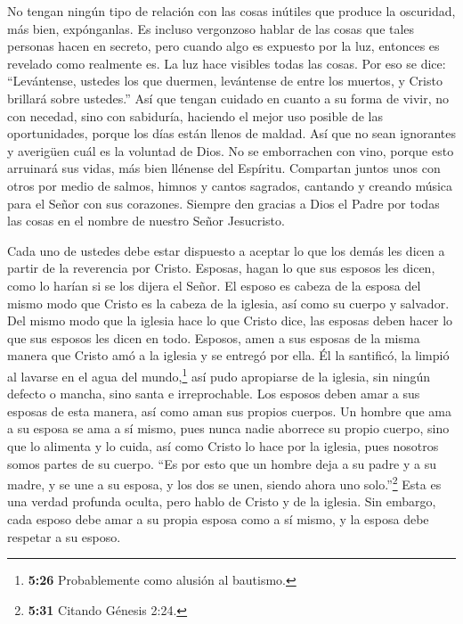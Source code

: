  No tengan ningún tipo de relación con las cosas inútiles
que produce la oscuridad, más bien, expónganlas.  Es
incluso vergonzoso hablar de las cosas que tales personas hacen en
secreto,  pero cuando algo es expuesto por la luz, entonces
es revelado como realmente es. La luz hace visibles todas las cosas.
 Por eso se dice: ``Levántense, ustedes los que duermen,
levántense de entre los muertos, y Cristo brillará sobre ustedes.''
 Así que tengan cuidado en cuanto a su forma de vivir, no
con necedad, sino con sabiduría,  haciendo el mejor uso
posible de las oportunidades, porque los días están llenos de maldad.
 Así que no sean ignorantes y averigüen cuál es la voluntad
de Dios.  No se emborrachen con vino, porque esto arruinará
sus vidas, más bien llénense del Espíritu.  Compartan
juntos unos con otros por medio de salmos, himnos y cantos sagrados,
cantando y creando música para el Señor con sus corazones. 
Siempre den gracias a Dios el Padre por todas las cosas en el nombre de
nuestro Señor Jesucristo.

 Cada uno de ustedes debe estar dispuesto a aceptar lo que
los demás les dicen a partir de la reverencia por Cristo. 
Esposas, hagan lo que sus esposos les dicen, como lo harían si se los
dijera el Señor.  El esposo es cabeza de la esposa del
mismo modo que Cristo es la cabeza de la iglesia, así como su cuerpo y
salvador.  Del mismo modo que la iglesia hace lo que Cristo
dice, las esposas deben hacer lo que sus esposos les dicen en todo.
 Esposos, amen a sus esposas de la misma manera que Cristo
amó a la iglesia y se entregó por ella.  Él la santificó,
la limpió al lavarse en el agua del mundo,\footnote{\textbf{5:26}
  Probablemente como alusión al bautismo.}  así pudo
apropiarse de la iglesia, sin ningún defecto o mancha, sino santa e
irreprochable.  Los esposos deben amar a sus esposas de
esta manera, así como aman sus propios cuerpos. Un hombre que ama a su
esposa se ama a sí mismo,  pues nunca nadie aborrece su
propio cuerpo, sino que lo alimenta y lo cuida, así como Cristo lo hace
por la iglesia,  pues nosotros somos partes de su cuerpo.
 ``Es por esto que un hombre deja a su padre y a su madre,
y se une a su esposa, y los dos se unen, siendo ahora uno
solo.''\footnote{\textbf{5:31} Citando Génesis 2:24.}  Esta
es una verdad profunda oculta, pero hablo de Cristo y de la iglesia.
 Sin embargo, cada esposo debe amar a su propia esposa como
a sí mismo, y la esposa debe respetar a su esposo.

